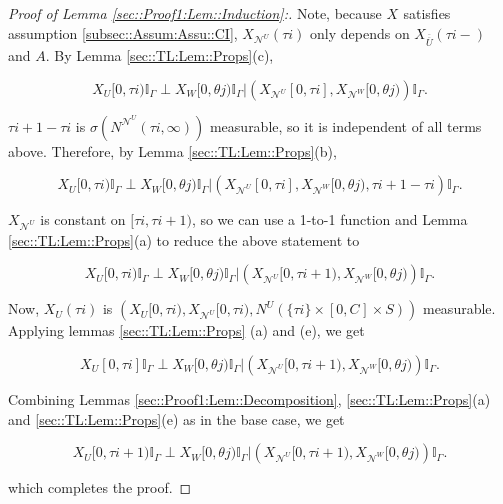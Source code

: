 \documentclass[12pt]{article}
\newcommand{\mb}{\mathbb}
\newcommand{\mc}{\mathcal}
\newcommand{\ov}{\overline}
\renewcommand{\U}{U}							%
\newcommand{\UU}{W}								%
\renewcommand{\S}{S}							%
\newcommand{\X}{X}								%
\newcommand{\neigh}{\mc{N}}						%
\newcommand{\vind}[1]{^{#1}}					%
\newcommand{\cind}[1]{_{#1}}					%
\newcommand{\cl}{\ov}							%
\newcommand{\tp}[1]{(#1)}						%
\newcommand{\tip}[1]{#1}						%
\newcommand{\const}{C}							%
\newcommand{\poiss}{N}							%
\newcommand{\indx}[1]{_{#1}}					%
\newcommand{\rt}{\tau}							%
\newcommand{\rtt}{\theta}						%
\newcommand{\apath}{\Gamma}						%
\newcommand{\rv}{A}								%
\begin{document}
\begin{proof}[Proof of Lemma \ref{sec::Proof1:Lem::Induction}:]
Note, because \(\X\cind{}\tip{}\) satisfies assumption \ref{subsec::Assum:Assu::CI}, \(\X\cind{\neigh\vind{\U}}\tp{\rt{i}}\) only depends on \(\X\cind{\cl{\cl{\U}}}\tp{\rt{i}-}\) and \(\rv\). By Lemma \ref{sec::TL:Lem::Props}(c), 

\[\X\cind{\U}\tip{[0,\rt{i})}\mb{I}_{\apath{}}\perp \X\cind{\UU}\tip{[0,\rtt{j})}\mb{I}_{\apath{}}|\left(\X\cind{\neigh\vind{\U}}\tip{[0,\rt{i}]},\X\cind{\neigh\vind{\UU}}\tip{[0,\rtt{j})}\right)\mb{I}_{\apath{}}.\]

\(\rt{i+1} - \rt{i}\) is \(\sigma(\poiss\vind{\neigh\vind{\U}}(\rt{i},\infty))\) measurable, so it is independent of all terms above. Therefore, by Lemma \ref{sec::TL:Lem::Props}(b),

\[\X\cind{\U}\tip{[0,\rt{i})}\mb{I}_{\apath{}}\perp \X\cind{\UU}\tip{[0,\rtt{j})}\mb{I}_{\apath{}}|\left(\X\cind{\neigh\vind{\U}}\tip{[0,\rt{i}]},\X\cind{\neigh\vind{\UU}}\tip{[0,\rtt{j})},\rt{i+1} - \rt{i}\right)\mb{I}_{\apath{}}.\]

\(\X\cind{\neigh\vind{\U}}\tip{}\) is constant on \([\rt{i},\rt{i+1})\), so we can use a 1-to-1 function and Lemma \ref{sec::TL:Lem::Props}(a) to reduce the above statement to

\[\X\cind{\U}\tip{[0,\rt{i})}\mb{I}_{\apath{}}\perp \X\cind{\UU}\tip{[0,\rtt{j})}\mb{I}_{\apath{}}|\left(\X\cind{\neigh\vind{\U}}\tip{[0,\rt{i+1})},\X\cind{\neigh\vind{\UU}}\tip{[0,\rtt{j})}\right)\mb{I}_{\apath{}}.\]

Now, \(\X\cind{\U}\tp{\rt{i}}\) is \(\left(\X\cind{\U}\tip{[0,\rt{i})}, \X\cind{\neigh\vind{\U}}\tip{[0,\rt{i})}, \poiss\vind{\U}(\{\rt{i}\}\times [0,\const\indx{}]\times\S)\right)\) measurable. Applying lemmas \ref{sec::TL:Lem::Props} (a) and (e), we get

\[\X\cind{\U}\tip{[0,\rt{i}]}\mb{I}_{\apath{}}\perp \X\cind{\UU}\tip{[0,\rtt{j})}\mb{I}_{\apath{}}|\left(\X\cind{\neigh\vind{\U}}\tip{[0,\rt{i+1})},\X\cind{\neigh\vind{\UU}}\tip{[0,\rtt{j})}\right)\mb{I}_{\apath{}}.\]

Combining Lemmas \ref{sec::Proof1:Lem::Decomposition}, \ref{sec::TL:Lem::Props}(a) and \ref{sec::TL:Lem::Props}(e) as in the base case, we get

\[\X\cind{\U}\tip{[0,\rt{i+1})}\mb{I}_{\apath{}}\perp \X\cind{\UU}\tip{[0,\rtt{j})}\mb{I}_{\apath{}}|\left(\X\cind{\neigh\vind{\U}}\tip{[0,\rt{i+1})},\X\cind{\neigh\vind{\UU}}\tip{[0,\rtt{j})}\right)\mb{I}_{\apath{}}.\]

which completes the proof.
\end{proof}
\end{document}
